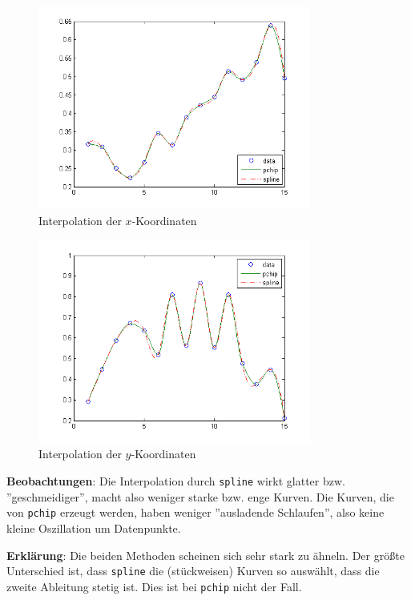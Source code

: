 \documentclass[11pt,a4paper,ngerman]{article}
\begin{document}
\begin{figure}[h]
\centering
\includegraphics[width=0.8\textwidth]{plotX.png}
\caption{Interpolation der $x$-Koordinaten\label{abb:1}}
\end{figure}

\begin{figure}[h]
\centering
\includegraphics[width=0.8\textwidth]{plotY.png}
\caption{Interpolation der $y$-Koordinaten\label{abb:2}}
\end{figure}

\textbf{Beobachtungen}: Die Interpolation durch \texttt{spline} wirkt glatter bzw. ''geschmeidiger'',
macht also weniger starke bzw. enge Kurven. Die Kurven, die von \texttt{pchip} erzeugt werden, haben
weniger ''ausladende Schlaufen'', also keine kleine Oszillation um Datenpunkte.

\textbf{Erklärung}: Die beiden Methoden scheinen sich sehr stark zu ähneln. Der größte Unterschied ist,
dass \texttt{spline} die (stückweisen) Kurven so auswählt, dass die zweite Ableitung stetig ist.
Dies ist bei \texttt{pchip} nicht der Fall.
\label{LastPage}
\end{document}
